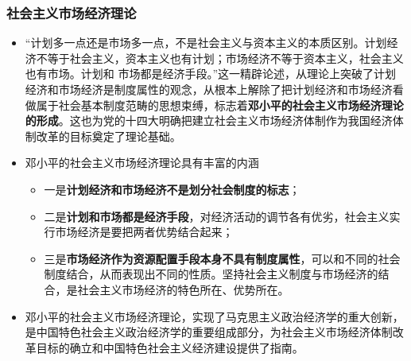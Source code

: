 \documentclass[12pt,openany]{ctexbook}
\begin{document}
\subsubsection{社会主义市场经济理论}
\begin{itemize}
  \item “计划多一点还是市场多一点，不是社会主义与资本主义的本质区别。计划经济不等于社会主义，资本主义也有计划；市场经济不等于资本主义，社会主义也有市场。计划和 市场都是经济手段。”这一精辟论述，从理论上突破了计划经济和市场经济是制度属性的观念，从根本上解除了把计划经济和市场经济看做属于社会基本制度范畴的思想束缚，标志着\textbf{邓小平的社会主义市场经济理论的形成}。这也为党的十四大明确把建立社会主义市场经济体制作为我国经济体制改革的目标奠定了理论基础。
  \item 邓小平的社会主义市场经济理论具有丰富的内涵
\begin{itemize}
  \item 一是\textbf{计划经济和市场经济不是划分社会制度的标志}；
  \item 二是\textbf{计划和市场都是经济手段}，对经济活动的调节各有优劣，社会主义实行市场经济是要把两者优势结合起来；
  \item 三是\textbf{市场经济作为资源配置手段本身不具有制度属性}，可以和不同的社会制度结合，从而表现出不同的性质。坚持社会主义制度与市场经济的结合，是社会主义市场经济的特色所在、优势所在。
\end{itemize}
  \item 邓小平的社会主义市场经济理论，实现了马克思主义政治经济学的重大创新，是中国特色社会主义政治经济学的重要组成部分，为社会主义市场经济体制改革目标的确立和中国特色社会主义经济建设提供了指南。
\end{itemize}
\end{document}
